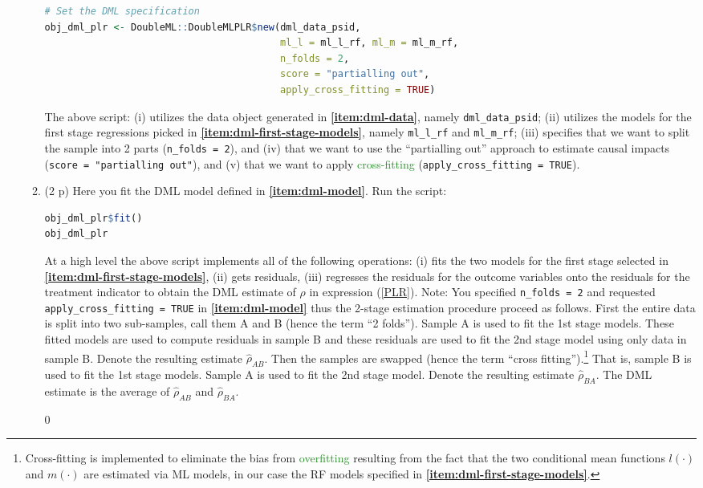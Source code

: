 \documentclass{article}
\begin{document}
\begin{enumerate}[label=\textbf{Q\arabic{enumi}}.,ref=Q\arabic{enumi}, wide=0pt, itemsep=0em, topsep=5pt, labelindent=0pt, resume]
\begin{enumerate}
\begin{lstlisting}[language=R]
# Set the DML specification
obj_dml_plr <- DoubleML::DoubleMLPLR$new(dml_data_psid, 
                                         ml_l = ml_l_rf, ml_m = ml_m_rf, 
                                         n_folds = 2,
                                         score = "partialling out",
                                         apply_cross_fitting = TRUE)
\end{lstlisting}
The above script: (i) utilizes the data object generated in \textbf{\ref{item:dml-data}}, namely \texttt{dml\_data\_psid}; (ii) utilizes the models for the first stage regressions picked in \textbf{\ref{item:dml-first-stage-models}}, namely \texttt{ml\_l\_rf} and \texttt{ml\_m\_rf}; (iii) specifies that we want to split the sample into 2 parts (\texttt{n\_folds = 2}), and (iv) that we want to use the ``partialling out'' approach to estimate causal impacts (\texttt{score = "partialling out"}), and (v) that we want to apply \textcolor{ForestGreen}{cross-fitting} (\texttt{apply\_cross\_fitting = TRUE}).\label{item:dml-model}
\item (2 p) Here you fit the DML model defined in \textbf{\ref{item:dml-model}}. Run the script:
\begin{lstlisting}[language=R]
obj_dml_plr$fit()
obj_dml_plr
\end{lstlisting}
At a high level the above script implements all of the following operations: (i) fits the two models for the first stage selected in \textbf{\ref{item:dml-first-stage-models}}, (ii) gets residuals, (iii) regresses the residuals for the outcome variables onto the residuals for the treatment indicator to obtain the DML estimate of $\rho$ in expression (\ref{PLR}). Note: You specified \texttt{n\_folds = 2} and requested \texttt{apply\_cross\_fitting = TRUE} in \textbf{\ref{item:dml-model}} thus the 2-stage estimation procedure proceed as follows. First the entire data is split into two sub-samples, call them A and B (hence the term ``2 folds''). Sample A is used to fit the 1st stage models. These fitted models are used to compute residuals in sample B and these residuals are used to fit the 2nd stage model using only data in sample B. Denote the resulting estimate $\hat{\rho}_{AB}$. Then the samples are swapped (hence the term ``cross fitting'').\footnote{Cross-fitting is implemented to eliminate the bias from \textcolor{ForestGreen}{overfitting} resulting from the fact that the two conditional mean functions $l(\cdot)$ and $m(\cdot)$ are estimated via ML models, in our case the RF models specified in \textbf{\ref{item:dml-first-stage-models}}.} That is, sample B is used to fit the 1st stage models. Sample A is used to fit the 2nd stage model. Denote the resulting estimate $\hat{\rho}_{BA}$. The DML estimate is the average of $\hat{\rho}_{AB}$ and $\hat{\rho}_{BA}$. 

0
\end{enumerate}

 


\end{enumerate}
\end{document}
